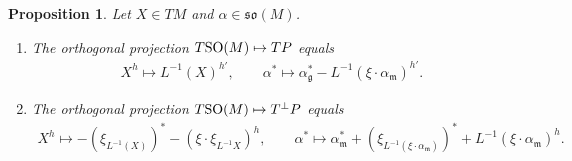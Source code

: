 \documentclass[10pt,a4paper]{amsart}
\numberwithin{equation}{section}
\newtheorem{Proposition}[Theorem]{Proposition}
\begin{document}
\begin{Proposition}\label{prop:ProjtoTP}
Let $X\in TM$ and $\alpha\in\mathfrak{so}(M)$.
\begin{enumerate}\itemsep=0pt
\item[$1.$] The orthogonal projection $T{\rm SO}(M)\mapsto TP$ equals
\begin{gather*}
X^h\mapsto L^{-1}(X)^{h'},\qquad
\alpha^{\ast}\mapsto \alpha_{\mathfrak{g}}^{\ast}-L^{-1}(\xi\cdot\alpha_{\mathfrak{m}})^{h'}.
\end{gather*}
\item[$2.$] The orthogonal projection $T{\rm SO}(M)\mapsto T^{\bot}P$ equals
\begin{gather*}
X^h\mapsto -(\xi_{L^{-1}(X)})^{\ast}-(\xi\cdot\xi_{L^{-1}X})^h,
\qquad
\alpha^{\ast}\mapsto \alpha_{\mathfrak{m}}^{\ast}
+(\xi_{L^{-1}(\xi\cdot\alpha_{\mathfrak{m}})})^{\ast}
+L^{-1}(\xi\cdot\alpha_{\mathfrak{m}})^h.
\end{gather*}
\end{enumerate}
\end{Proposition}
\end{document}
